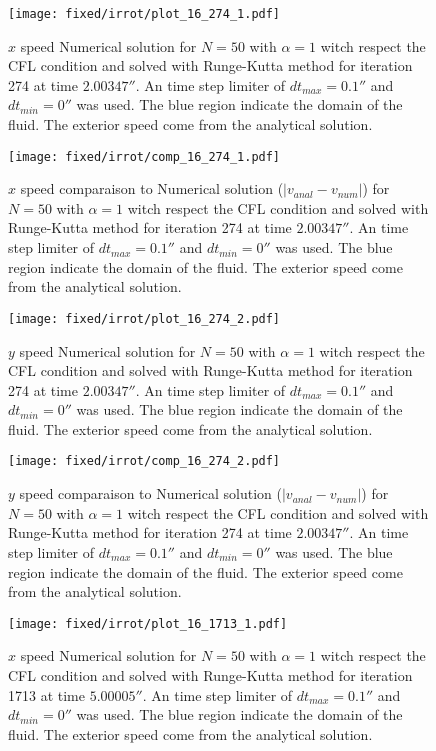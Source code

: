 \begin{figure}
\texttt{[image: fixed/irrot/plot\_16\_274\_1.pdf]}
\caption{$x$ speed Numerical solution for $N=50$ with $\alpha=1$ witch respect the CFL condition and solved with Runge-Kutta method
for iteration 274 at time $\unit{2.00347}{\second}$.
An time step limiter of $dt_{max}=\unit{0.1}{\second}$ and $dt_{min}=\unit{0}{\second}$ was used.
The blue region indicate the domain of the fluid. The exterior speed come from the analytical solution.
\label{fix:plot_16_274_1}
}
\end{figure}

\begin{figure}
\texttt{[image: fixed/irrot/comp\_16\_274\_1.pdf]}
\caption{$x$ speed comparaison to Numerical solution  ($|v_{anal}-v_{num}|$) for $N=50$ with $\alpha=1$ witch respect the CFL condition and solved with Runge-Kutta method
for iteration 274 at time $\unit{2.00347}{\second}$.
An time step limiter of $dt_{max}=\unit{0.1}{\second}$ and $dt_{min}=\unit{0}{\second}$ was used.
The blue region indicate the domain of the fluid. The exterior speed come from the analytical solution.
\label{fix:comp_16_274_1}
}
\end{figure}

\begin{figure}
\texttt{[image: fixed/irrot/plot\_16\_274\_2.pdf]}
\caption{$y$ speed Numerical solution for $N=50$ with $\alpha=1$ witch respect the CFL condition and solved with Runge-Kutta method
for iteration 274 at time $\unit{2.00347}{\second}$.
An time step limiter of $dt_{max}=\unit{0.1}{\second}$ and $dt_{min}=\unit{0}{\second}$ was used.
The blue region indicate the domain of the fluid. The exterior speed come from the analytical solution.
\label{fix:plot_16_274_2}
}
\end{figure}

\begin{figure}
\texttt{[image: fixed/irrot/comp\_16\_274\_2.pdf]}
\caption{$y$ speed comparaison to Numerical solution ($|v_{anal}-v_{num}|$) for $N=50$ with $\alpha=1$ witch respect the CFL condition and solved with Runge-Kutta method
for iteration 274 at time $\unit{2.00347}{\second}$.
An time step limiter of $dt_{max}=\unit{0.1}{\second}$ and $dt_{min}=\unit{0}{\second}$ was used.
The blue region indicate the domain of the fluid. The exterior speed come from the analytical solution.
\label{fix:comp_16_274_2}
}
\end{figure}

\begin{figure}
\texttt{[image: fixed/irrot/plot\_16\_1713\_1.pdf]}
\caption{$x$ speed Numerical solution for $N=50$ with $\alpha=1$ witch respect the CFL condition and solved with Runge-Kutta method
for iteration 1713 at time $\unit{5.00005}{\second}$.
An time step limiter of $dt_{max}=\unit{0.1}{\second}$ and $dt_{min}=\unit{0}{\second}$ was used.
The blue region indicate the domain of the fluid. The exterior speed come from the analytical solution.
\label{fix:plot_16_1713_1}
}
\end{figure}

